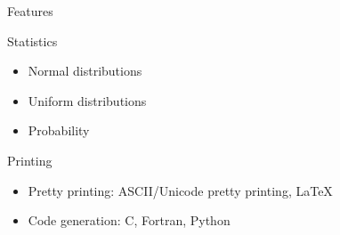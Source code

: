 \documentclass[xcolor=svgnames]{beamer}
\begin{document}
\begin{frame}{Features}
  \begin{block}{Statistics}
    \begin{itemize}
    \item Normal distributions
    \item Uniform distributions
    \item Probability
    \end{itemize}
  \end{block}
\end{frame}

\begin{frame}
  \begin{block}{Printing}
    \begin{itemize}
    \item Pretty printing: ASCII/Unicode pretty printing, LaTeX
    \item Code generation: C, Fortran, Python
    \end{itemize}
  \end{block}
\end{frame}
\end{document}
